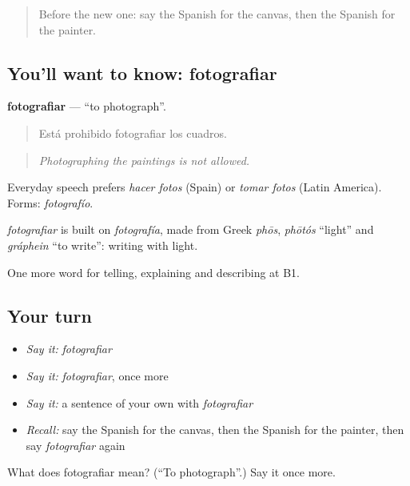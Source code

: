 \label{lesson:ES-C763-fotografiar}



\begin{quote}
Before the new one: say the Spanish for the canvas, then the Spanish for the painter.
\end{quote}

\subsection*{You'll want to know: fotografiar}
\textbf{fotografiar} — \textquotedblleft{}to photograph\textquotedblright{}.

\begin{quote}
Está prohibido fotografiar los cuadros.
\end{quote}

\begin{quote}
\emph{Photographing the paintings is not allowed.}
\end{quote}

Everyday speech prefers \emph{hacer fotos} (Spain) or \emph{tomar fotos} (Latin America). Forms: \emph{fotografío}.

\begin{cousinweb}
\emph{fotografiar} is built on \emph{fotografía}, made from Greek \emph{phōs}, \emph{phōtós} \textquotedblleft{}light\textquotedblright{} and \emph{gráphein} \textquotedblleft{}to write\textquotedblright{}: writing with light.
\end{cousinweb}

\begin{grammarlens}[title={What you've built}]
One more word for telling, explaining and describing at B1.
\end{grammarlens}

\subsection*{Your turn}
\begin{itemize}
\raggedright
  \item \emph{Say it:} \emph{fotografiar}
  \item \emph{Say it:} \emph{fotografiar}, once more
  \item \emph{Say it:} a sentence of your own with \emph{fotografiar}
  \item \emph{Recall:} say the Spanish for the canvas, then the Spanish for the painter, then say \emph{fotografiar} again
\end{itemize}

\begin{tcolorbox}[breakable,colback=teal!4,colframe=teal!35!black,title={Before you move on}]
What does fotografiar mean? (\textquotedblleft{}To photograph\textquotedblright{}.) Say it once more.
\end{tcolorbox}
